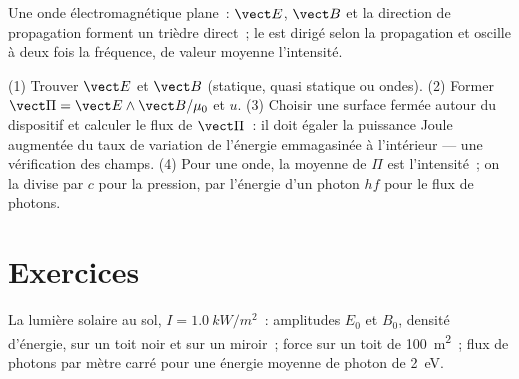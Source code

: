 \begin{omfigure}

{\small Une onde électromagnétique plane~: $\vect E$, $\vect B$ et la
direction de propagation forment un trièdre direct~; le  est dirigé selon la propagation et oscille à deux fois la
fréquence, de valeur moyenne l'intensité.}
\end{omfigure}

\begin{method}\label{met:b2:poynting-vector:method}
(1) Trouver $\vect E$ et $\vect B$ (statique, quasi statique ou ondes). (2)
Former $\vect\Pi = \vect E\wedge\vect B/\mu_0$ et $u$. (3) Choisir une surface
fermée autour du dispositif et calculer le flux de $\vect\Pi$~: il doit
égaler la puissance Joule augmentée du taux de variation de l'énergie emmagasinée
à l'intérieur --- une vérification des champs. (4) Pour une onde, la moyenne de $\Pi$ est
l'intensité~; on la divise par $c$ pour la pression, par l'énergie d'un photon
$hf$ pour le flux de photons.
\end{method}

\section{Exercices}

\begin{exercise}[$\star$]\label{exo:b2:poynting-vector:1}
La lumière solaire au sol, $I = \qty{1.0}{kW/m^2}$~: amplitudes $E_0$ et $B_0$,
densité d'énergie,  sur un toit noir et sur un miroir~;
force sur un toit de \qty{100}{m^2}~; flux de photons par mètre carré pour une
énergie moyenne de photon de \qty{2}{eV}.
\end{exercise}


